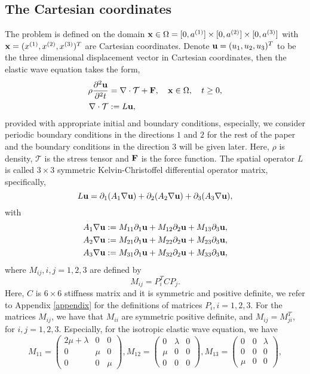 \subsection{The Cartesian coordinates}
The problem is defined on the domain ${\bf x}\in\Omega = [0,a^{(1)}]\times[0,a^{(2)}]\times[0,a^{(3)}]$ with ${\bf x} = (x^{(1)},x^{(2)},x^{(3)})^T$ are Cartesian coordinates. Denote ${\bf u} = (u_1,u_2,u_3)^T$ to be the three dimensional displacement vector in Cartesian coordinates, then the elastic wave equation takes the form,
\begin{align*}
\rho\frac{\partial^2{\bf u}}{\partial^2 t} &= \nabla\cdot\mathcal{T} + {\bf F}, \ \ \ {\bf x}\in\Omega,\ \ \ t\geq 0,\\
\nabla\cdot\mathcal{T} &:= L{\bf u},
\end{align*}
provided with appropriate initial and boundary conditions, especially, we consider periodic boundary conditions in the directions $1$ and $2$ for the rest of the paper and the boundary conditions in the direction $3$ will be given later. Here, $\rho$ is density, $\mathcal{T}$ is the stress tensor and ${\bf F}$ is the force function. The spatial operator $L$ is called $3\times3$ symmetric Kelvin-Christoffel differential operator matrix, specifically,
\begin{equation*}
L{\bf  u} = \partial_1(A_1\nabla{\bf u}) + \partial_2(A_2\nabla{\bf u}) + \partial_3(A_3\nabla{\bf u}),
\end{equation*}
with
\begin{align*}
A_1\nabla{\bf u} &:= M_{11}\partial_1{\bf u} + M_{12}\partial_2{\bf u} + M_{13}\partial_3{\bf u}, \\
A_2\nabla{\bf u} &:= M_{21}\partial_1{\bf u} + M_{22}\partial_2{\bf u} + M_{23}\partial_3{\bf u}, \\
A_3\nabla{\bf u} &:= M_{31}\partial_1{\bf u} + M_{32}\partial_2{\bf u} + M_{33}\partial_3{\bf u},
\end{align*}
where $M_{ij}, i,j = 1,2,3$ are defined by
\begin{equation}\label{Mmatrices}
M_{ij} = P^T_iCP_j.
\end{equation}
Here, $C$ is $6\times 6$ stiffness matrix and it is symmetric and positive definite, we refer to Appendix \ref{appendix} for the definitions of matrices $P_i, i = 1,2,3$. For the matrices $M_{ij}$, we have that $M_{ii}$ are symmetric positive definite, and $M_{ij}=M^T_{ji}$, for $i,j=1,2,3$. Especially, for the isotropic elastic wave equation, we have
\[ M_{11} = \left(\begin{array}{ccc}
2\mu+\lambda & 0 & 0\\
0 & \mu & 0\\
0 & 0 & \mu\end{array}\right), M_{12} = \left(\begin{array}{ccc}
0 & \lambda & 0\\
\mu & 0 & 0\\
0 & 0 & 0\end{array}\right), M_{13} = \left(\begin{array}{ccc}
0 & 0 & \lambda\\
0 & 0 & 0\\
\mu & 0 & 0\end{array}\right),\]
